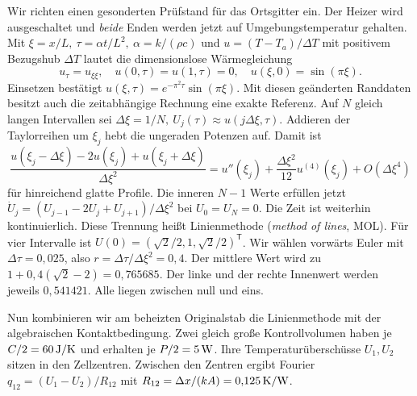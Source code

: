 Wir richten einen gesonderten Prüfstand für das Ortsgitter ein. Der Heizer wird ausgeschaltet und \emph{beide} Enden werden jetzt auf Umgebungstemperatur gehalten. Mit \(\xi=x/L,\ \tau=\alpha t/L^2,\ \alpha=k/(\rho c)\) und \(u=(T-T_a)/\Delta T\) mit positivem Bezugshub \(\Delta T\) lautet die dimensionslose Wärmegleichung
\[
 u_\tau=u_{\xi\xi},\quad u(0,\tau)=u(1,\tau)=0,\quad
 u(\xi,0)=\sin(\pi\xi).
\]
Einsetzen bestätigt \(u(\xi,\tau)=e^{-\pi^2\tau}\sin(\pi\xi)\). Mit diesen geänderten Randdaten besitzt auch die zeitabhängige Rechnung eine exakte Referenz.
Auf \(N\) gleich langen Intervallen sei \(\Delta\xi=1/N,\ U_j(\tau)\approx u(j\Delta\xi,\tau)\). Addieren der Taylorreihen um \(\xi_j\) hebt die ungeraden Potenzen auf. Damit ist
\[
 \frac{u(\xi_j-\Delta\xi)-2u(\xi_j)+u(\xi_j+\Delta\xi)}{\Delta\xi^2}
 =u''(\xi_j)+\frac{\Delta\xi^2}{12}u^{(4)}(\xi_j)+O(\Delta\xi^4)
\]
für hinreichend glatte Profile. Die inneren \(N-1\) Werte erfüllen jetzt \(\dot U_j=(U_{j-1}-2U_j+U_{j+1})/\Delta\xi^2\) bei \(U_0=U_N=0\). Die Zeit ist weiterhin kontinuierlich. Diese Trennung heißt Linienmethode (\emph{method of lines}, MOL).
Für vier Intervalle ist \(U(0)=(\sqrt2/2,1,\sqrt2/2)^\mathsf T\). Wir wählen vorwärts Euler mit \(\Delta\tau=0{,}025\), also \(r=\Delta\tau/\Delta\xi^2=0{,}4\). Der mittlere Wert wird zu \(1+0{,}4(\sqrt2-2)=0{,}765685\). Der linke und der rechte Innenwert werden jeweils \(0{,}541421\). Alle liegen zwischen null und eins.

Nun kombinieren wir am beheizten Originalstab die Linienmethode mit der algebraischen Kontaktbedingung. Zwei gleich große Kontrollvolumen haben je \(C/2=60\,\mathrm{J/K}\) und erhalten je \(P/2=5\,\mathrm{W}\). Ihre Temperaturüberschüsse \(U_1,U_2\) sitzen in den Zellzentren. Zwischen den Zentren ergibt Fourier \(q_{12}=(U_1-U_2)/R_{12}\) mit \(R_{12}=\Delta x/(kA)=0{,}125\,\mathrm{K/W}\).

